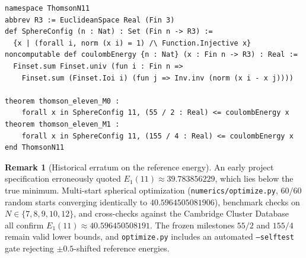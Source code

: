 \documentclass[11pt,reqno]{amsart}
\renewcommand{\_}{\origunderscore\allowbreak}
\theoremstyle{definition}
\newtheorem{remark}[theorem]{Remark}
\begin{document}
\begin{lstlisting}[caption={Frozen base definitions and milestone declarations in \texttt{ComparatorChallenges/\allowbreak ThomsonN11.lean} (ASCII rendering; $10$ constants total, matched verbatim in \texttt{Solution.lean}).},label={lst:challenge}]
namespace ThomsonN11
abbrev R3 := EuclideanSpace Real (Fin 3)
def SphereConfig (n : Nat) : Set (Fin n -> R3) :=
  {x | (forall i, norm (x i) = 1) /\ Function.Injective x}
noncomputable def coulombEnergy {n : Nat} (x : Fin n -> R3) : Real :=
  Finset.sum Finset.univ (fun i : Fin n =>
    Finset.sum (Finset.Ioi i) (fun j => Inv.inv (norm (x i - x j))))

theorem thomson_eleven_M0 :
    forall x in SphereConfig 11, (55 / 2 : Real) <= coulombEnergy x
theorem thomson_eleven_M1 :
    forall x in SphereConfig 11, (155 / 4 : Real) <= coulombEnergy x
end ThomsonN11
\end{lstlisting}

\begin{remark}[Historical erratum on the reference energy]\label{rem:erratum}
An early project specification erroneously quoted $E_1(11) \approx 39.783856229$, which lies below the true minimum. Multi-start spherical optimization (\texttt{numerics/optimize.py}, $60/60$ random starts converging identically to $40.5964505081906$), benchmark checks on $N \in \{7,8,9,10,12\}$, and cross-checks against the Cambridge Cluster Database~\cite{WalesUlker2006} all confirm $E_1(11) \approx 40.596450508191$. The frozen milestones $55/2$ and $155/4$ remain valid lower bounds, and \texttt{optimize.py} includes an automated \texttt{--selftest} gate rejecting $\pm 0.5$-shifted reference energies.
\end{remark}
\end{document}
